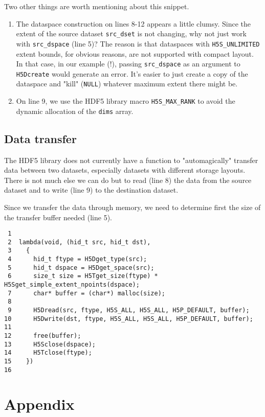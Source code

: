 \documentclass[a4paper, 12pt]{article}
\begin{document}
Two other things are worth mentioning about this snippet.

\begin{enumerate}
\item The dataspace construction on lines 8-12 appears a
little clumsy. Since the extent of the source dataset \texttt{src\_dset} is not
changing, why not just work with \texttt{src\_dspace} (line 5)? The
reason is that dataspaces with \texttt{H5S\_UNLIMITED} extent bounds, for obvious
reasons, are not supported with compact layout. In that case, in our
example (!), passing \texttt{src\_dspace} as an argument to \texttt{H5Dcreate} would
generate an error. It's easier to just create a copy of the dataspace and
"kill" (\texttt{NULL}) whatever maximum extent there might be.
\item On line 9, we use the HDF5 library macro
\texttt{H5S\_MAX\_RANK} to avoid the dynamic allocation of the \texttt{dims} array.
\end{enumerate}

\subsection{Data transfer \label{org01157bd}}
\label{sec:org03b7667}

The HDF5 library does not currently have a function to "automagically"
transfer data between two datasets, especially datasets with different
storage layouts. There is not much else we can do but to read (line
8) the data from the source dataset and to write (line
9) to the destination dataset.

Since we transfer the data through memory, we need to determine first the
size of the transfer buffer needed (line 5).

\begin{verbatim}
 1
 2  lambda(void, (hid_t src, hid_t dst),
 3    {
 4      hid_t ftype = H5Dget_type(src);
 5      hid_t dspace = H5Dget_space(src);
 6      size_t size = H5Tget_size(ftype) * H5Sget_simple_extent_npoints(dspace);
 7      char* buffer = (char*) malloc(size);
 8
 9      H5Dread(src, ftype, H5S_ALL, H5S_ALL, H5P_DEFAULT, buffer);
10      H5Dwrite(dst, ftype, H5S_ALL, H5S_ALL, H5P_DEFAULT, buffer);
11
12      free(buffer);
13      H5Sclose(dspace);
14      H5Tclose(ftype);
15    })
16
\end{verbatim}

\section{Appendix}
\label{sec:org7bc92a7}
\end{document}
